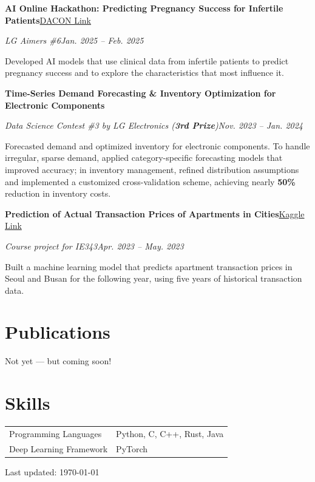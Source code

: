 \documentclass[11pt,a4paper]{article}
\newcommand{\entry}[4]{%
  \vspace{4pt}%
  {\bfseries #1}\hfill{#2}\par
  \vspace{1pt}%
  {\itshape #3}\hfill{\itshape #4}\par
  \vspace{2pt}%
}
\begin{document}
\entry{AI Online Hackathon: Predicting Pregnancy Success for Infertile Patients}
      {\href{https://dacon.io/competitions/official/236452/overview/description}{DACON Link}}                    %
      {LG Aimers \#6}{Jan. 2025 -- Feb. 2025}
Developed AI models that use clinical data from infertile patients to predict
pregnancy success and to explore the characteristics that most influence it.

\entry{Time-Series Demand Forecasting \& Inventory Optimization for Electronic Components}
      {}
      {Data Science Contest \#3 by LG Electronics \textnormal{(\textbf{3rd Prize})}}{Nov. 2023 -- Jan. 2024}
Forecasted demand and optimized inventory for electronic components. To handle
irregular, sparse demand, applied category-specific forecasting models that
improved accuracy; in inventory management, refined distribution assumptions and
implemented a customized cross-validation scheme, achieving nearly \textbf{50\%}
reduction in inventory costs.

\entry{Prediction of Actual Transaction Prices of Apartments in Cities}
      {\href{https://www.kaggle.com/competitions/kaist-ie343-2023-spring/overview}{Kaggle Link}}             %
      {Course project for IE343}{Apr. 2023 -- May. 2023}
Built a machine learning model that predicts apartment transaction prices in
Seoul and Busan for the following year, using five years of historical
transaction data.

\section{Publications}
Not yet --- but coming soon!

\section{Skills}
\begin{tabular}{@{}p{5cm}l@{}}
Programming Languages    & Python, C, C++, Rust, Java \\
Deep Learning Framework  & PyTorch \\
\end{tabular}

\vfill
\begin{center}
  \footnotesize Last updated: \today
\end{center}
\end{document}
